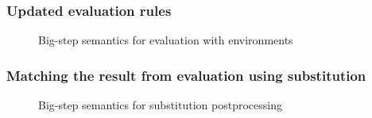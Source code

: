 \documentclass{beamer}
\begin{document}
\begin{frame}
  \frametitle{Updated evaluation rules}


  \begin{figure}
    \footnotesize
    \centering
    
    \caption{Big-step semantics for evaluation with environments}
    \label{fig:eval-env-rules}
  \end{figure}
\end{frame}


  
%     

\begin{frame}
  \frametitle{Matching the result from evaluation using substitution}

  \begin{figure}
    \centering
    \footnotesize
    \renewcommand{\judgboxfontsize}{\footnotesize}
    
    \caption{Big-step semantics for substitution postprocessing}
    \label{fig:pplc-rules}
  \end{figure}
\end{frame}
\end{document}
